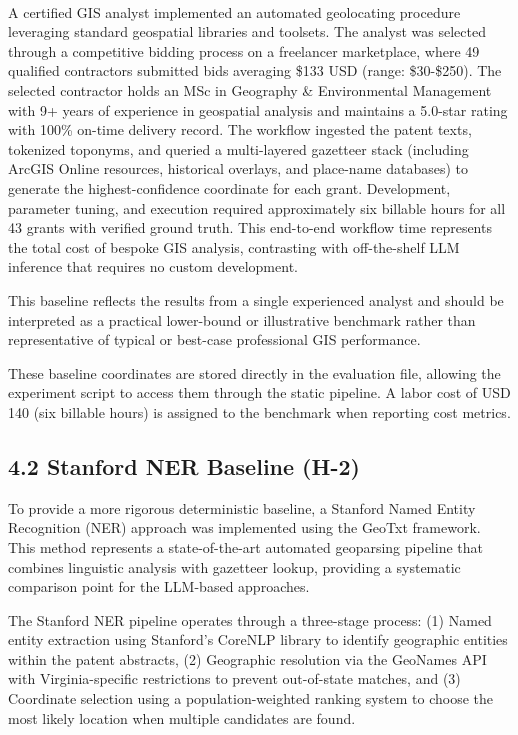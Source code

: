 \documentclass[
  10pt,
  twocolumn]{article}
\begin{document}
A certified GIS
analyst\textsuperscript{} implemented
an automated geolocating procedure leveraging standard geospatial
libraries and toolsets. The analyst was selected through a competitive
bidding process on a freelancer marketplace, where 49 qualified
contractors submitted bids averaging \$133 USD (range: \$30-\$250). The
selected contractor holds an MSc in Geography \& Environmental
Management with 9+ years of experience in geospatial analysis and
maintains a 5.0-star rating with 100\% on-time delivery record. The
workflow ingested the patent texts, tokenized toponyms, and queried a
multi-layered gazetteer stack (including ArcGIS Online resources,
historical overlays, and place-name databases) to generate the
highest-confidence coordinate for each grant. Development, parameter
tuning, and execution required approximately six billable hours for all
43 grants with verified ground truth. This end-to-end workflow time
represents the total cost of bespoke GIS analysis, contrasting with
off-the-shelf LLM inference that requires no custom development.

This baseline reflects the results from a single experienced analyst and
should be interpreted as a practical lower-bound or illustrative
benchmark rather than representative of typical or best-case
professional GIS performance.

These baseline coordinates are stored directly in the evaluation file,
allowing the experiment script to access them through the static
pipeline. A labor cost of USD 140 (six billable hours) is assigned to
the benchmark when reporting cost metrics.

\subsection{4.2 Stanford NER Baseline
(H-2)}\label{stanford-ner-baseline-h-2}

To provide a more rigorous deterministic baseline, a Stanford Named
Entity Recognition (NER) approach was implemented using the GeoTxt
framework. This method represents a state-of-the-art automated
geoparsing pipeline that combines linguistic analysis with gazetteer
lookup, providing a systematic comparison point for the LLM-based
approaches.

The Stanford NER pipeline operates through a three-stage process: (1)
Named entity extraction using Stanford's CoreNLP library to identify
geographic entities within the patent abstracts, (2) Geographic
resolution via the GeoNames API with Virginia-specific restrictions to
prevent out-of-state matches, and (3) Coordinate selection using a
population-weighted ranking system to choose the most likely location
when multiple candidates are found.
\end{document}
